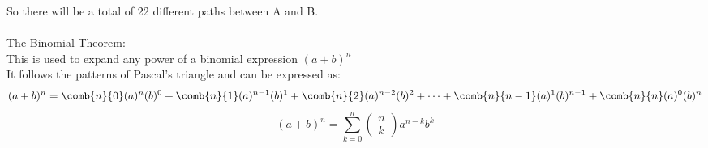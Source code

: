 So there will be a total of 22 different paths between A and B.\\
\\
The Binomial Theorem:\\
This is used to expand any power of a binomial expression $(a+b)^n$\\
It follows the patterns of Pascal's triangle and can be expressed as:
$$(a+b)^n=\comb{n}{0}(a)^n(b)^0+\comb{n}{1}(a)^{n-1}(b)^1+\comb{n}{2}(a)^{n-2}(b)^2+\cdots+\comb{n}{n-1}(a)^1(b)^{n-1}+\comb{n}{n}(a)^0(b)^n$$
$$(a+b)^n=\sum_{k=0}^n\left(\begin{matrix}n\\k\end{matrix}\right)a^{n-k}b^k$$

